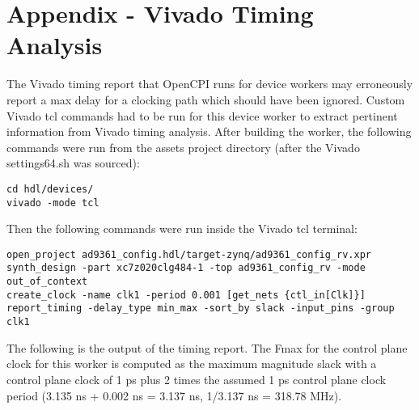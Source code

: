 \documentclass{article}
\begin{document}
\section{Appendix - Vivado Timing Analysis}
\label{appendix:timing}
The Vivado timing report that OpenCPI runs for device workers may erroneously report a max delay for a clocking path which should have been ignored. Custom Vivado tcl commands had to be run for this device worker to extract pertinent information from Vivado timing analysis. After building the worker, the following commands were run from the assets project directory (after the Vivado settings64.sh was sourced):
\begin{lstlisting}
cd hdl/devices/
vivado -mode tcl
\end{lstlisting}
Then the following commands were run inside the Vivado tcl terminal:
\begin{lstlisting}
open_project ad9361_config.hdl/target-zynq/ad9361_config_rv.xpr
synth_design -part xc7z020clg484-1 -top ad9361_config_rv -mode out_of_context
create_clock -name clk1 -period 0.001 [get_nets {ctl_in[Clk]}]
report_timing -delay_type min_max -sort_by slack -input_pins -group clk1
\end{lstlisting}
The following is the output of the timing report. The Fmax for the control plane clock for this worker is computed as the maximum magnitude slack with a control plane clock of 1 ps plus 2 times the assumed 1 ps control plane clock period (3.135 ns + 0.002 ns = 3.137 ns, 1/3.137 ns = 318.78 MHz).
\fontsize{6}{12}\selectfont
\end{document}
